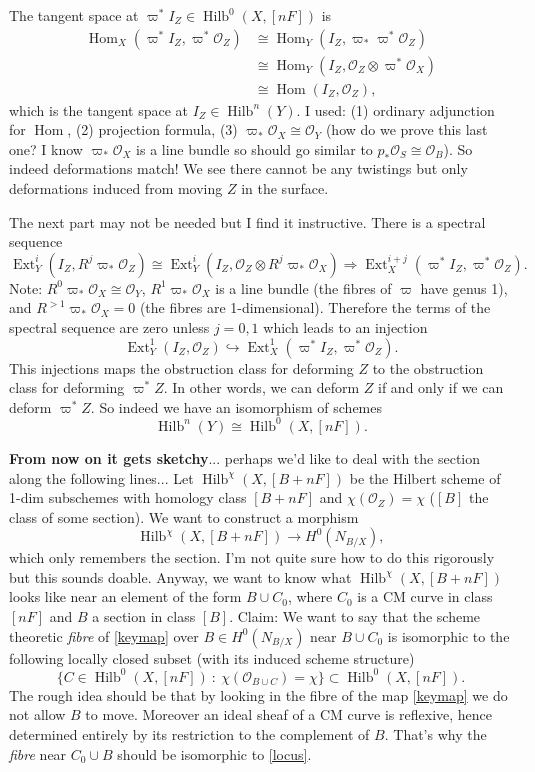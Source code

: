 \documentclass{amsart}
\theoremstyle{definition}
\renewcommand{\O}{\mathcal{O}}
\newcommand{\Hom}{\operatorname{Hom}}
\newcommand{\Ext}{\operatorname{Ext}}
\newcommand{\Hilb}{\operatorname{Hilb}}
\begin{document}
The tangent space at $\varpi^* I_Z \in \Hilb^0(X,[nF])$ is
\begin{align*}
\Hom_X(\varpi^* I_Z , \varpi^* \O_Z) &\cong \Hom_Y(I_Z , \varpi_* \varpi^* \O_Z) \\
&\cong \Hom_Y(I_Z , \O_Z \otimes  \varpi^* \O_X) \\
&\cong \Hom(I_Z,\O_Z),
\end{align*}
which is the tangent space at $I_Z \in \Hilb^n(Y)$. I used: (1) ordinary adjunction for $\Hom$, (2) projection formula, (3) $\varpi_* \O_X \cong \O_Y$ (how do we prove this last one? I know $\varpi_* \O_X$ is a line bundle so should go similar to $p_* \O_S \cong \O_B$). So indeed deformations match! We see there cannot be any twistings but only deformations induced from moving $Z$ in the surface. 

The next part may not be needed but I find it instructive. There is a spectral sequence
$$
\Ext^{i}_{Y}(I_Z, R^j \varpi_* \O_Z) \cong \Ext^{i}_{Y}(I_Z, \O_Z \otimes R^j \varpi_* \O_X) \Rightarrow \Ext^{i+j}_{X}(\varpi^* I_Z, \varpi^* \O_Z).
$$
Note: $R^0 \varpi_* \O_X \cong \O_Y$, $R^1 \varpi_* \O_X$ is a line bundle (the fibres of $\varpi$ have genus 1), and $R^{>1} \varpi_* \O_X = 0$ (the fibres are 1-dimensional). Therefore the terms of the spectral sequence are zero unless $j=0,1$ which leads to an injection
$$
\Ext^{1}_{Y}(I_Z,\O_Z) \hookrightarrow \Ext^{1}_{X}(\varpi^* I_Z ,\varpi^* \O_Z).
$$
This injections maps the obstruction class for deforming $Z$ to the obstruction class for deforming $\varpi^* Z$. In other words, we can deform $Z$ if and only if we can deform $\varpi^* Z$. So indeed we have an isomorphism of schemes
$$
\Hilb^n(Y) \cong \Hilb^0(X,[nF]).
$$

\textbf{From now on it gets sketchy}... perhaps we'd like to deal with the section along the following lines... Let $\Hilb^\chi(X,[B+nF])$ be the Hilbert scheme of 1-dim subschemes with homology class $[B+nF]$ and $\chi(\O_Z) = \chi$ ($[B]$ the class of some section). We want to construct a morphism
\begin{equation} \label{keymap}
\Hilb^\chi(X,[B+nF]) \rightarrow H^0(N_{B/X}),
\end{equation}
which only remembers the section. I'm not quite sure how to do this rigorously but this sounds doable. Anyway, we want to know what $\Hilb^\chi(X,[B+nF])$ looks like near an element of the form  $B \cup C_0$, where $C_0$ is a CM curve in class $[nF]$ and $B$ a section in class $[B]$. Claim: We want to say that the scheme theoretic \emph{fibre} of \eqref{keymap} over $B \in H^0(N_{B/X})$ near $B \cup C_0$ is isomorphic to the following locally closed subset (with its induced scheme structure)
\begin{equation} \label{locus}
\{ C \in \Hilb^0(X,[nF]) \ : \  \chi(\O_{B \cup C}) = \chi \} \subset \Hilb^0(X,[nF]).
\end{equation}
The rough idea should be that by looking in the fibre of the map \eqref{keymap} we do not allow $B$ to move. Moreover an ideal sheaf of a CM curve is reflexive, hence determined entirely by its restriction to the complement of $B$. That's why the \emph{fibre} near $C_0 \cup B$ should be isomorphic to \eqref{locus}.
\end{document}

